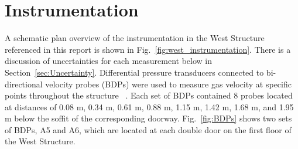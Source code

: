 \documentclass[12pt,oneside]{book}
\begin{document}
\section{Instrumentation}
\label{sec:Instrumentation}
A schematic plan overview of the instrumentation in the West Structure referenced in this report is shown in Fig.~\ref{fig:west_instrumentation}. There is a discussion of uncertainties for each measurement below in Section~\ref{sec:Uncertainty}. Differential pressure transducers connected to bi-directional velocity probes (BDPs) were used to measure gas velocity at specific points throughout the structure ~\cite{McCaffrey:Combustion_and_Flame}. Each set of BDPs contained 8 probes located at distances of 0.08 m, 0.34 m, 0.61 m, 0.88 m, 1.15 m, 1.42 m, 1.68 m, and 1.95 m below the soffit of the corresponding doorway. Fig.~\ref{fig:BDPs} shows two sets of BDPs, A5 and A6, which are located at each double door on the first floor of the West Structure.
\end{document}
